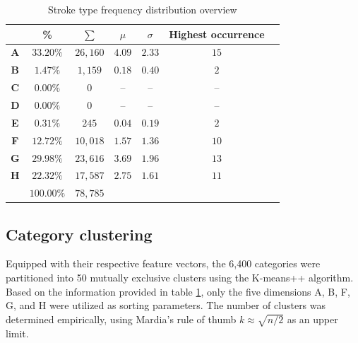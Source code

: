 \documentclass[10pt,conference,a4paper]{IEEEtran}
\begin{document}
	\begin{table}[b]
		\renewcommand{\arraystretch}{1.3}
		\caption{Stroke type frequency distribution overview }
		\label{tbl_stroke_analysis}
		\centering
		\begin{tabular}{ c | c c c c c l }
			\hline
			  & \bfseries \% & \small $\sum$ & $\mu$ & $\sigma$ & \footnotesize Highest occurrence \\ 
			\hline
			\hline
			\bfseries A & $33.20\%$ & $26,160$ & $4.09$ & $2.33$ & $15$ & \\%
			\bfseries B & $1.47\%$  & $1,159$  & $0.18$ & $0.40$ & $2$  & \\%
			\bfseries C & $0.00\%$  & $0$      & --     & --     & --   & \\%
			\bfseries D & $0.00\%$  & $0$      & --     & --     & --   & \\%
			\bfseries E & $0.31\%$  & $245$    & $0.04$ & $0.19$ & $2$  & \\%
			\bfseries F & $12.72\%$ & $10,018$ & $1.57$ & $1.36$ & $10$ & \\%
			\bfseries G & $29.98\%$ & $23,616$ & $3.69$ & $1.96$ & $13$ & \\%
			\bfseries H & $22.32\%$ & $17,587$ & $2.75$ & $1.61$ & $11$ & \\%
			\hline
			            & $100.00\%$   & $78,785$ &        &        &      & \\
			\hline
		\end{tabular}
	\end{table}


	\subsection{Category clustering}

	Equipped with their respective feature vectors, the 6,400 categories were partitioned into 50
	mutually exclusive clusters using the K-means++ algorithm. \cite{arthur2007k}
	Based on the information provided
	in table \ref{tbl_stroke_analysis}, only the five dimensions A, B, F, G, and H were utilized as sorting parameters.
	The number of clusters was determined empirically, using Mardia's rule of thumb \mbox{$k \approx \sqrt{n / 2}$} \cite{mardia2005multivariate}
	as an upper limit.
	
\end{document}
